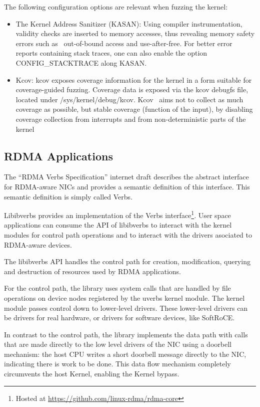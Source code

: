 The following configuration options are relevant when fuzzing the kernel:

\begin{itemize}
\item The Kernel Address Sanitizer (KASAN): Using compiler instrumentation, validity checks are inserted to memory accesses, thus revealing memory safety errors such as \
  out-of-bound access and use-after-free. For better error reports containing stack traces, one can also enable the option CONFIG\_STACKTRACE along KASAN\cite{KernelAddressSanitizer}.
\item Kcov: kcov exposes coverage information for the kernel in a form suitable for coverage-guided fuzzing. Coverage data is exposed via the kcov debugfs file, located under /sys/kernel/debug/kcov. Kcov \
  aims not to collect as much coverage as possible, but stable coverage (function of the input), by disabling coverage collection from interrupts and from non-deterministic parts of the kernel\cite{KcovCodeCoveragea}
\end{itemize}

\subsection{RDMA Applications}

The ``RDMA Verbs Specification'' internet draft describes the abstract
interface for RDMA-aware NICs and provides a semantic definition of this
interface. This semantic definition is simply called Verbs\cite{hillandRDMAProtocolVerbs}.

Libibverbs provides an implementation of the Verbs interface\footnote{Hosted at \url{https://github.com/linux-rdma/rdma-core}}. User space
applications can consume the API of libibverbs to interact with
the kernel modules for control path operations and to interact with the drivers asociated
to RDMA-aware devices.

The libibverbs API handles the control path for creation, modification, querying and destruction of resources used by RDMA applications.

For the control path, the library uses system calls that are handled by file operations on device nodes
registered by the uverbs kernel module. The kernel module passes control down to lower-level drivers.
These lower-level drivers can be drivers for real hardware, or drivers for software devices, like SoftRoCE.\@

In contrast to the control path,  the library implements the data path with calls that are made
directly to the low level drivers of the NIC using a doorbell mechanism: the host CPU %
writes a short doorbell message directly to the
NIC, indicating there is work to be done\cite{kaliaUsingRDMAEfficiently2014}. This data flow mechanism completely circumvents the
host Kernel, enabling the Kernel bypass\cite{kaliaDesignGuidelinesHigh2016}.

